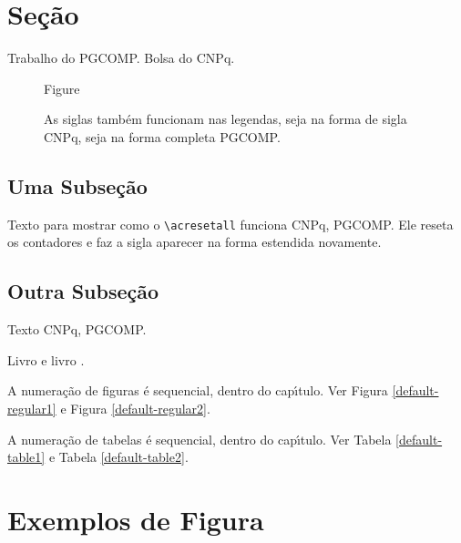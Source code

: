 \documentclass[bsc, classic, a4paper]{ufbathesis}
\begin{document}

\acresetall 

\section{Se\c{c}\~{a}o}
Trabalho do  \ac{PGCOMP}. Bolsa do \ac{CNPq}.

\begin{figure}[h]
    Figure
    \caption[As siglas também funcionam nas legendas]{As siglas também funcionam nas legendas, seja na forma de sigla \ac{CNPq}, seja na forma completa \acf{PGCOMP}.}
\end{figure}

\lipsum

\subsection{Uma Subse\c{c}\~{a}o}
\acresetall
Texto para mostrar como o \verb|\acresetall| funciona \ac{CNPq}, \ac{PGCOMP}. Ele reseta os contadores e faz a sigla aparecer na forma estendida novamente.

\subsection{Outra Subse\c{c}\~{a}o}

Texto  \acf{CNPq}, \acf{PGCOMP}.



\lipsum

Livro \cite{demeyer2008} e  livro \cite{raymond1999}.


A numera\c{c}\~{a}o de figuras \'{e} sequencial, dentro do cap\'{\i}tulo. Ver Figura \ref{default-regular1} e Figura \ref{default-regular2}.

A numera\c{c}\~{a}o de tabelas \'{e} sequencial, dentro do cap\'{\i}tulo. Ver Tabela \ref{default-table1} e Tabela \ref{default-table2}.


\section{Exemplos de Figura}
\end{document}
